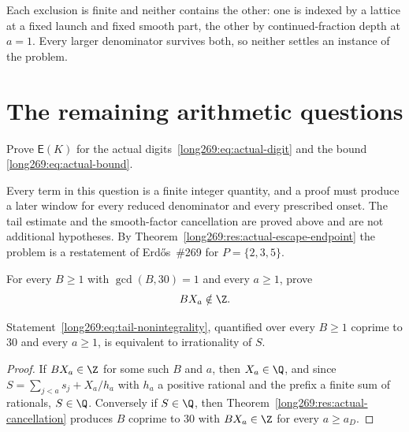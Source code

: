 \documentclass[11pt]{article}
\newcommand{\Esc}{\mathsf E}
\begin{document}
Each exclusion is finite and neither contains the other: one is indexed by a
lattice at a fixed launch and fixed smooth part, the other by continued-fraction
depth at $a=1$.  Every larger denominator survives both, so neither settles an
instance of the problem.

\section{The remaining arithmetic questions}\label{long269:sec:open}

\begin{problem}\label{long269:prob:producer}
Prove $\Esc(K)$ for the actual digits~\eqref{long269:eq:actual-digit} and the bound
\eqref{long269:eq:actual-bound}.
\end{problem}

Every term in this question is a finite integer quantity, and a proof must
produce a later window for every reduced denominator and every prescribed
onset.  The tail estimate and the smooth-factor cancellation are proved above
and are not additional hypotheses.  By
Theorem~\ref{long269:res:actual-escape-endpoint} the problem is a restatement of
Erd\H{o}s~\#269 for $P=\{2,3,5\}$.

\begin{problem}\label{long269:prob:tails269}
For every $B\ge1$ with $\gcd(B,30)=1$ and every $a\ge1$, prove
\begin{equation}\label{long269:eq:tail-nonintegrality}
 BX_a\notin\Z .
\end{equation}
\end{problem}

\begin{proposition}
\label{long269:res:tails-equivalence}
Statement~\eqref{long269:eq:tail-nonintegrality}, quantified over every $B\ge1$
coprime to $30$ and every $a\ge1$, is equivalent to irrationality of $S$.
\end{proposition}

\begin{proof}
If $BX_a\in\Z$ for some such $B$ and $a$, then $X_a\in\Q$, and since
$S=\sum_{j<a}s_j+X_a/h_a$ with $h_a$ a positive rational and the prefix a
finite sum of rationals, $S\in\Q$.  Conversely if $S\in\Q$, then
Theorem~\ref{long269:res:actual-cancellation} produces $B$ coprime to $30$ with
$BX_a\in\Z$ for every $a\ge a_D$.
\end{proof}
\end{document}
